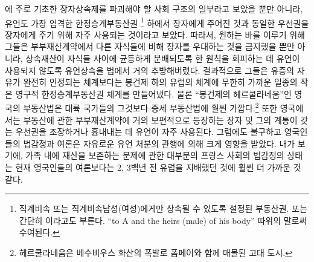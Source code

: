 에 주로 기초한
장자상속제를
파괴해야 할 사회 구조의 일부라고
보았을 뿐만 아니라,
유언도
가장 엄격한 한정승계부동산권%
\footnote{직계비속 또는 직계비속남성(여성)에게만 상속될 수 있도록
  설정된 부동산권.
   또는 간단히 이라고도 부른다.
  ``to A and the heirs (male) of his body'' 따위의 말로써 수여된다.
  }
하에서 장자에게 주어진 것과
동일한 우선권을
장자에게
주기 위해 자주 사용되는 것이라고 보았다.
따라서,
원하는 바를 이루기 위해 그들은
부부재산계약에서 다른 자식들에 비해 장자를 우대하는 것을 금지했을 뿐만 아니라,
상속재산이 자식들 사이에 균등하게 분배되도록 한 원칙을 회피하는 데
유언이
사용되지 않도록
유언상속을 법에서 거의 추방해버렸다.
결과적으로 그들은
유증의 자유가 완전히 인정되는 체계보다는
봉건제 하의 유럽의 체계에 무한히 가까운
일종의 작은 영구적 한정승계부동산권 체계를 만들어냈다.
물론
``봉건제의 헤르쿨라네움''인 영국의 부동산법은
대륙 국가들의 그것보다 중세 부동산법에 훨씬 가깝다.\footnote{%
  헤르쿨라네움은 베수비우스 화산의 폭발로 폼페이와 함께 매몰된 고대 도시.}
또한 영국에서는
부동산에 관한 부부재산계약에 거의 보편적으로 등장하는
장자 및 그의 계통이 갖는 우선권을 조장하거나 흉내내는 데
유언이
자주 사용된다.
그럼에도 불구하고 영국인들의 법감정과 여론은
자유로운 유언 처분의 관행에 의해 크게 영향을 받았다.
내가 보기에,
가족 내에 재산을 보존하는 문제에 관한
대부분의 프랑스 사회의 법감정의 상태는
현재 영국인들의 여론보다는 2, 3백년 전 유럽을 지배했던 것에
훨씬 더 가까운 것 같다.


